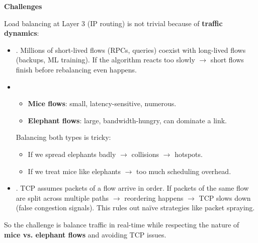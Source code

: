 \highspace
\begin{flushleft}
    \textcolor{Red2}{ \textbf{Challenges}}
\end{flushleft}
Load balancing at Layer 3 (IP routing) is not trivial because of \textbf{traffic dynamics}:
\begin{itemize}
    \item {}. Millions of short-lived flows (RPCs, queries) coexist with long-lived flows (backups, ML training). If the algorithm reacts too slowly $\rightarrow$ short flows finish before rebalancing even happens.
    \item {}
    \begin{itemize}
        \item \textbf{Mice flows}: small, latency-sensitive, numerous.
        \item \textbf{Elephant flows}: large, bandwidth-hungry, can dominate a link.
    \end{itemize}
    Balancing both types is tricky:
    \begin{itemize}
        \item If we spread elephants badly $\rightarrow$ collisions $\rightarrow$ hotspots.
        \item If we treat mice like elephants $\rightarrow$ too much scheduling overhead.
    \end{itemize}
    \item {}. TCP assumes packets of a flow arrive in order. If packets of the same flow are split across multiple paths $\rightarrow$ reordering happens $\rightarrow$ TCP slows down (false congestion signals). This rules out naïve strategies like packet spraying.
\end{itemize}
So the challenge is balance traffic in real-time while respecting the nature of \textbf{mice vs. elephant flows} and avoiding TCP issues.